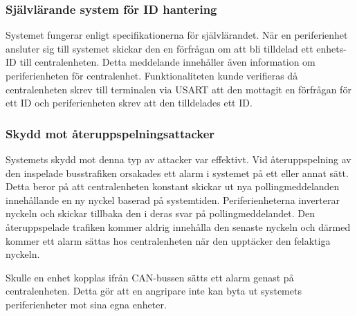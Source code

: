 \documentclass[a4paper]{article}
\newcommand{\todo}[1]{\marginpar{TODO: #1}\vspace{1cm}}
\begin{document}
\subsubsection{Självlärande system för ID hantering}
Systemet fungerar enligt specifikationerna för självlärandet.
När en periferienhet ansluter sig till systemet skickar den en förfrågan om att bli tilldelad ett enhets-ID till centralenheten.
Detta meddelande innehåller även information om periferienheten för centralenhet.
Funktionaliteten kunde verifieras då centralenheten skrev till terminalen via USART att den mottagit en förfrågan för ett ID och periferienheten skrev att den tilldelades ett ID.

\subsubsection{Skydd mot återuppspelningsattacker}
Systemets skydd mot denna typ av attacker var effektivt.
Vid återuppspelning av den inspelade busstrafiken orsakades ett alarm i systemet på ett eller annat sätt.
Detta beror på att centralenheten konstant skickar ut nya pollingmeddelanden innehållande en ny nyckel baserad på systemtiden.
Periferienheterna inverterar nyckeln och skickar tillbaka den i deras svar på pollingmeddelandet.
Den återuppspelade trafiken kommer aldrig innehålla den senaste nyckeln och därmed kommer ett alarm sättas hos centralenheten när den upptäcker den felaktiga nyckeln.

Skulle en enhet kopplas ifrån CAN-bussen sätts ett alarm genast på centralenheten.
Detta gör att en angripare inte kan byta ut systemets periferienheter mot sina egna enheter.

\end{document}

